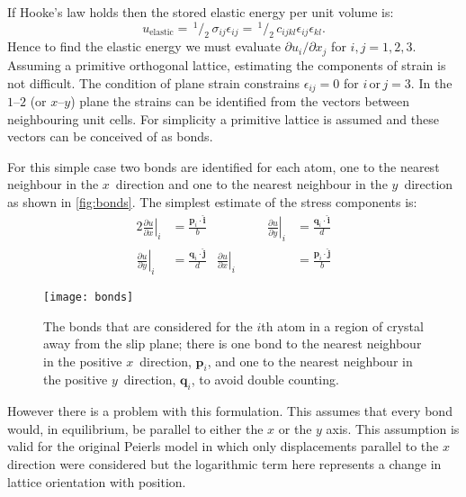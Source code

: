 If Hooke's law holds then the stored elastic energy per unit volume is:
\begin{equation}
u_{\text{elastic}} =\, ^{1}\!/_{2}\, \sigma_{ij} \epsilon_{ij} =\, ^{1}\!/_{2}\, c_{ijkl} \epsilon_{ij} \epsilon_{kl}.
\end{equation}
Hence to find the elastic energy we must evaluate \({\partial u_i}/{\partial x_j}\) for $i, j = 1, 2, 3$.
Assuming a primitive orthogonal lattice, estimating the components of strain is not difficult. The  condition of plane strain constrains $\epsilon_{ij} = 0$ for $i\, \text{or}\, j=3$. In the $1$--$2$ (or $x$--$y$) plane the strains can be identified from the vectors between neighbouring unit cells. For simplicity a primitive lattice is assumed and these vectors can be conceived of as bonds.

For this simple case two bonds are identified for each atom, one to the nearest neighbour in the $x$~direction and one to the nearest neighbour in the $y$~direction as shown in \autoref{fig:bonds}. The simplest estimate of the stress components is:
\begin{alignat}{2}\label{eqn:estimate_strains}
\left. \frac{\partial u}{\partial x}\right|_i &= \frac{\mathbf{p}_i \cdot \mathbf{\hat{i}}}{b} &\qquad\qquad
\left. \frac{\partial u}{\partial y}\right|_i &= \frac{\mathbf{q}_i \cdot \mathbf{\hat{i}}}{d} \nonumber\\
\left. \frac{\partial u}{\partial y}\right|_i &= \frac{\mathbf{q}_i \cdot \mathbf{\hat{j}}}{d} &
\left. \frac{\partial u}{\partial x}\right|_i &= \frac{\mathbf{p}_i \cdot \mathbf{\hat{j}}}{b}
\end{alignat}


\begin{figure}
\centering
\texttt{[image: bonds]}
\caption[Strained bonds in a dislocated crystal.]{The bonds that are considered for the $i$th atom in a region of crystal away from the slip plane; there is one bond to the nearest neighbour in the positive $x$~direction, $\mathbf{p}_i$, and one to the nearest neighbour in the positive $y$~direction, $\mathbf{q}_i$, to avoid double counting.\label{fig:bonds} }
\end{figure}





However there is a problem with this formulation. This assumes that every bond would, in equilibrium, be parallel to either the $x$ or the $y$ axis. This assumption is valid for the original Peierls model in which only displacements parallel to the $x$ direction were considered but the logarithmic term here represents a change in lattice orientation with position. 

